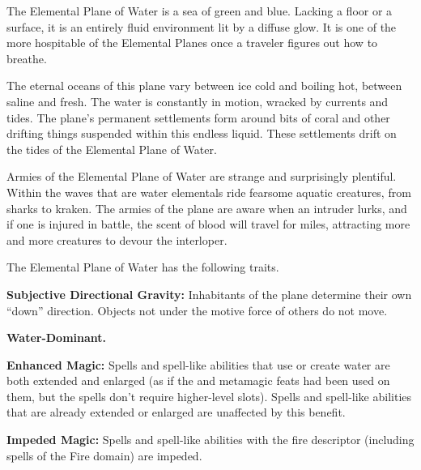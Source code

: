 The Elemental Plane of Water is a sea of green and blue. Lacking a floor or a surface, it is an entirely fluid environment lit by a diffuse glow. It is one of the more hospitable of the Elemental Planes once a traveler figures out how to breathe.

The eternal oceans of this plane vary between ice cold and boiling hot, between saline and fresh. The water is constantly in motion, wracked by currents and tides. The plane's permanent settlements form around bits of coral and other drifting things suspended within this endless liquid. These settlements drift on the tides of the Elemental Plane of Water.

Armies of the Elemental Plane of Water are strange and surprisingly plentiful. Within the waves that are water elementals ride fearsome aquatic creatures, from sharks to kraken. The armies of the plane are aware when an intruder lurks, and if one is injured in battle, the scent of blood will travel for miles, attracting more and more creatures to devour the interloper.

The Elemental Plane of Water has the following traits.
\begin{itemize*}
\item \textbf{Subjective Directional Gravity:} Inhabitants of the plane determine their own ``down'' direction. Objects not under the motive force of others do not move.
\item \textbf{Water-Dominant.}
\item \textbf{Enhanced Magic:} Spells and spell-like abilities that use or create water are both extended and enlarged (as if the  and  metamagic feats had been used on them, but the spells don't require higher-level slots). Spells and spell-like abilities that are already extended or enlarged are unaffected by this benefit.
\item \textbf{Impeded Magic:} Spells and spell-like abilities with the fire descriptor (including spells of the Fire domain) are impeded.
\end{itemize*}
